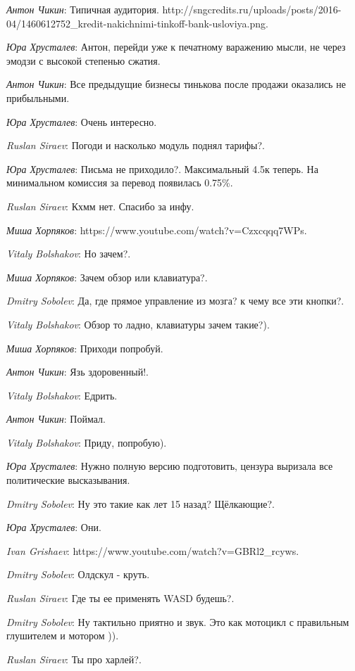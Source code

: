 \documentclass[10pt]{book}
\newcommand{\AUTHOR}[1]{\emph{#1}:}
\begin{document}
\AUTHOR{Антон Чикин} Типичная аудитория. http://sngcredits.ru/uploads/posts/2016-04/1460612752_kredit-nakichnimi-tinkoff-bank-usloviya.png.

\AUTHOR{Юра Хрусталев} Антон, перейди уже к печатному варажению мысли, не через эмодзи с высокой степенью сжатия.

\AUTHOR{Антон Чикин} Все предыдущие бизнесы тинькова после продажи оказались не прибыльными.

\AUTHOR{Юра Хрусталев} Очень интересно.

\AUTHOR{Ruslan Siraev} Погоди и насколько модуль поднял тарифы?.

\AUTHOR{Юра Хрусталев} Письма не приходило?. Максимальный 4.5к теперь. На минимальном комиссия за перевод появилась 0.75\%.

\AUTHOR{Ruslan Siraev} Кхмм нет. Спасибо за инфу.

\AUTHOR{Миша Хорпяков} https://www.youtube.com/watch?v=Czxcqqq7WPs.

\AUTHOR{Vitaly Bolshakov} Но зачем?.

\AUTHOR{Миша Хорпяков} Зачем обзор или клавиатура?.

\AUTHOR{Dmitry Sobolev} Да, где прямое управление из мозга? к чему все эти кнопки?.

\AUTHOR{Vitaly Bolshakov} Обзор то ладно, клавиатуры зачем такие?).

\AUTHOR{Миша Хорпяков} Приходи попробуй.

\AUTHOR{Антон Чикин} Язь здоровенный!.

\AUTHOR{Vitaly Bolshakov} Едрить.

\AUTHOR{Антон Чикин} Поймал.

\AUTHOR{Vitaly Bolshakov} Приду, попробую).

\AUTHOR{Юра Хрусталев} Нужно полную версию подготовить, цензура выризала все политические высказывания.

\AUTHOR{Dmitry Sobolev} Ну это такие как лет 15 назад? Щёлкающие?.

\AUTHOR{Юра Хрусталев} Они.

\AUTHOR{Ivan Grishaev} https://www.youtube.com/watch?v=GBRl2_rcyws.

\AUTHOR{Dmitry Sobolev} Олдскул - круть.

\AUTHOR{Ruslan Siraev} Где ты ее применять WASD будешь?.

\AUTHOR{Dmitry Sobolev} Ну тактильно приятно и звук. Это как мотоцикл с правильным глушителем и мотором )).

\AUTHOR{Ruslan Siraev} Ты про харлей?.
\end{document}
